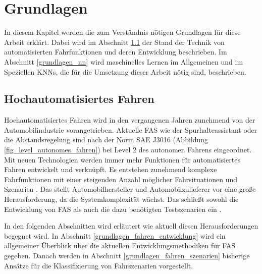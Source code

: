 
\chapter{Grundlagen}
\label{grundlagen}

In diesem Kapitel werden die zum Verständnis nötigen Grundlagen für diese Arbeit erklärt. Dabei wird im Abschnitt \ref{grundlagen_fahren} der Stand der Technik von automatisierten Fahrfunktionen und deren Entwicklung beschrieben. Im Abschnitt \ref{grundlagen_nn} wird maschinelles Lernen im Allgemeinen und im Speziellen \acp{KNN}, die für die Umsetzung dieser Arbeit nötig sind, beschrieben.

\section{Hochautomatisiertes Fahren}
\label{grundlagen_fahren}

Hochautomatisiertes Fahren wird in den vergangenen Jahren zunehmend von der Automobilindustrie vorangetrieben. Aktuelle \ac{FAS} wie der Spurhalteassistant oder die Abstandsregelung sind nach der Norm SAE J3016 (Abbildung \ref{fig_level_autonomes_fahren}) bei Level 2 des autonomen Fahrens eingeordnet. Mit neuen Technologien werden immer mehr Funktionen für automatisiertes Fahren entwickelt und verknüpft. Es entstehen zunehmend komplexe Fahrfunktionen mit einer steigenden Anzahl möglicher Fahrsituationen und Szenarien \cite{king2017identification}.  Das stellt Automobilhersteller und Automobilzulieferer vor eine große Herausforderung, da die Systemkomplexität  wächst. Das schließt sowohl die Entwicklung von \ac{FAS} als auch die dazu benötigten Testszenarien ein \cite{pfeffer2016continuous}  .

In den folgenden Abschnitten wird erläutert wie aktuell diesen Herausforderungen begegnet wird. In Abschnitt \ref{grundlagen_fahren_entwicklung} wird ein allgemeiner Überblick über die aktuellen Entwicklungsmethodiken für \ac{FAS} gegeben. Danach werden in Abschnitt \ref{grundlagen_fahren_szenarien} bisherige Ansätze für die Klassifizierung von Fahrszenarien vorgestellt.

